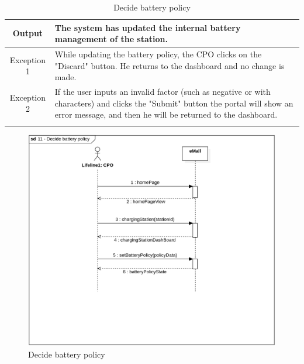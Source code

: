 \begin{longtable}{|c| p{10cm}|}
    \hline
    Output           & The system has updated the internal battery management of the station.
    \\
    \hline
    \hline
    Exception 1      &  While updating the battery policy, the CPO clicks on the "Discard" button. He returns to the dashboard and no change is made. \\
    \hline
    Exception 2     & If the user inputs an invalid factor (such as negative or with characters) and clicks the "Submit" button the portal will show an error message, and then he will be returned to the dashboard.
    \\
    \hline
    \caption{Decide battery policy}\\
\end{longtable}
\begin{figure}[H]
    \begin{center}
        \includegraphics[width=\textwidth]{img/sequence/battery.png}
        \caption{Decide battery policy}
    \end{center}
\end{figure}
